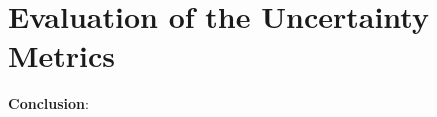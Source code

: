 \section{Evaluation of the Uncertainty Metrics}
\label{ch:evaluation:sec:evaluation_metrics}









\textbf{Conclusion}:\\